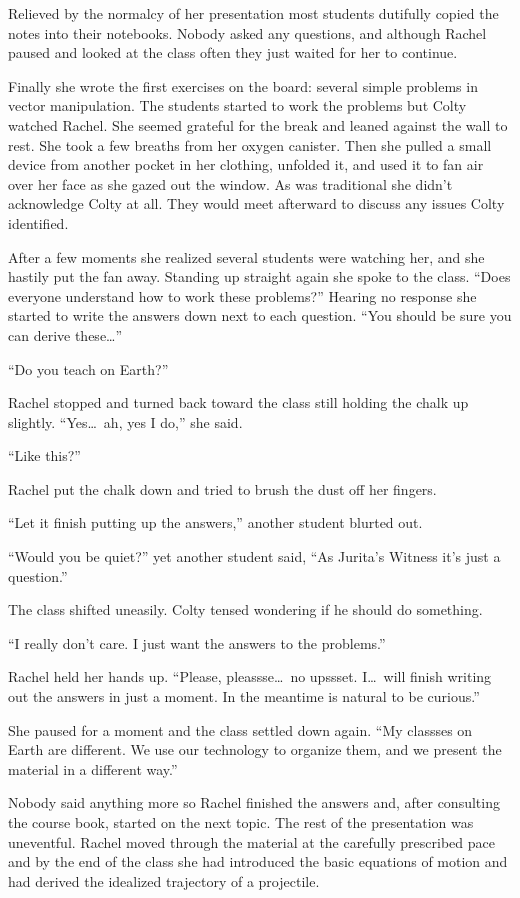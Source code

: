 Relieved by the normalcy of her presentation most students dutifully copied the notes into their
notebooks. Nobody asked any questions, and although Rachel paused and looked at the class often
they just waited for her to continue.

Finally she wrote the first exercises on the board: several simple problems in vector
manipulation. The students started to work the problems but Colty watched Rachel. She seemed
grateful for the break and leaned against the wall to rest. She took a few breaths from her
oxygen canister. Then she pulled a small device from another pocket in her clothing, unfolded
it, and used it to fan air over her face as she gazed out the window. As was traditional she
didn't acknowledge Colty at all. They would meet afterward to discuss any issues Colty
identified.

After a few moments she realized several students were watching her, and she hastily put the fan
away. Standing up straight again she spoke to the class. ``Does everyone understand how to work
these problems?'' Hearing no response she started to write the answers down next to each
question. ``You should be sure you can derive these\ldots''

``Do you teach on Earth?''

Rachel stopped and turned back toward the class still holding the chalk up slightly.
``Yes\ldots\ ah, yes I do,'' she said.

``Like this?''

Rachel put the chalk down and tried to brush the dust off her fingers.

``Let it finish putting up the answers,'' another student blurted out.

``Would you be quiet?'' yet another student said, ``As Jurita's Witness it's just a question.''

The class shifted uneasily. Colty tensed wondering if he should do something.

``I really don't care. I just want the answers to the problems.''

Rachel held her hands up. ``Please, pleassse\ldots\ no upssset. I\ldots\ will finish writing out
the answers in just a moment. In the meantime is natural to be curious.''

She paused for a moment and the class settled down again. ``My classses on Earth are different.
We use our technology to organize them, and we present the material in a different way.''

Nobody said anything more so Rachel finished the answers and, after consulting the course book,
started on the next topic. The rest of the presentation was uneventful. Rachel moved through the
material at the carefully prescribed pace and by the end of the class she had introduced the
basic equations of motion and had derived the idealized trajectory of a projectile.

